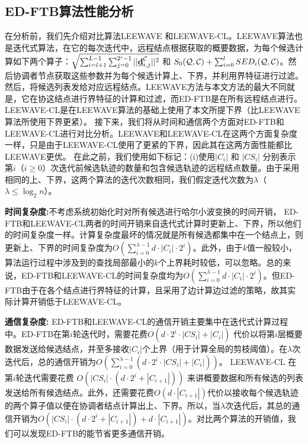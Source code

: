  \subsection{ED-FTB算法性能分析}
 在分析前，我们先介绍对比算法LEEWAVE 和LEEWAVE-CL。LEEWAVE算法也是迭代式算法，在它的每次迭代中，远程结点根据获取的概要数据，为每个候选计算如下两个算子：$\sqrt{\sum_{i=l+1}^{L-1}\sum_{j=0}^{2^i-1}||\emph{{\textbf{d}}}_{i,j}^{\cal C}||^2}$ 和  $S_{0}({\cal Q},{\cal C})+\sum_{i=0}^{l}SED_{i}({\cal Q},{\cal C})$。然后协调者节点获取这些参数并为每个候选计算上、下界，并利用界特征进行过滤。然后，将候选列表发给对应远程结点。LEEWAVE方法与本文方法的最大不同就是，它在协这结点进行界特征的计算和过滤，而ED-FTB是在所有远程结点进行。
 LEEWAVE-CL是在LEEWAVE算法的基础上使用了本文所提下界（比LEEWAVE算法所使用下界更紧）。
 接下来，我们将从时间和通信两个方面对ED-FTB和LEEWAVE-CL进行对比分析。LEEWAVE和LEEWAVE-CL在这两个方面复杂度一样，只是由于LEEWAVE-CL使用了更紧的下界，因此其在这两方面性能都比LEEWAVE更优。
 在此之前，我们使用如下标记：(i)使用$|C_{i}|$ 和 $|CS_{i}|$ 分别表示第$i$（$i\ge 0$）次迭代前候选轨迹的数量和包含候选轨迹的远程结点数量。由于采用相同的上、下界，这两个算法的迭代次数相同，我们假定迭代次数为$\lambda$（$\lambda \le \log_{2}n$）。
 
  \textbf{时间复杂度:}不考虑系统初始化时对所有候选进行哈尔小波变换的时间开销， ED-FTB和LEEWAVE-CL两者的时间开销来自迭代式计算时更新上、下界，所以他们的时间复杂度一样。计算复杂度最坏的情况就是所有候选都集中在一个结点上，则更新上、下界的时间复杂度为$O(\sum_{i=0}^{\lambda-1} d\cdot |C_{i}| \cdot 2^{i})$。此外，由于$k$值一般较小，算法运行过程中涉及到的查找局部最小的$k$个上界耗时较低，可以忽略。总的来说，ED-FTB和LEEWAVE-CL的时间复杂度均为$O(\sum_{i=0}^{\lambda-1} d\cdot |C_{i}| \cdot 2^{i})$。但ED-FTB由于在各个结点进行界特征的计算，且采用了边计算边过滤的策略，故其实际计算开销低于LEEWAVE-CL。
 
  \textbf{通信复杂度:}
ED-FTB和LEEWAVE-CL的通信开销主要集中在迭代式计算过程中。ED-FTB在第$i$轮迭代时，需要花费$O(d\cdot 2^{i}\cdot |CS_{i}|+|C_{i}|)$ 代价以将第$i$层概要数据发送给候选结点，并至多接收$|C_{i}|$个上界（用于计算全局的剪枝阈值）。在$\lambda$次迭代后，总的通信开销为$O(\sum_{i=0}^{\lambda-1}(d \cdot 2^{i} \cdot|CS_{i}| + |C_{i}|))$。
LEEWAVE-CL 在第$i$轮迭代需要花费 $O(|CS_{i}| \cdot (d\cdot 2^{i}+ |C_{i+1}|))$ 来讲概要数据和所有候选的列表发送给所有候选结点。此外，还需要花费$O(d\cdot |C_{i+1}|)$代价以接收每个候选轨迹的两个算子值以便在协调者结点计算出上、下界。所以，当$\lambda$次迭代后，其总的通信开销为$O(|CS_{i}| \cdot (d\cdot 2^{i}+ |C_{i+1}|)+d\cdot |C_{i+1}|)$。对比两个算法的开销值，我们可以发现ED-FTB的能节省更多通信开销。
 
